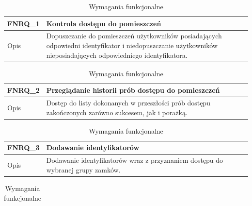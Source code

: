         \begin{table}[h!]
            \caption{Wymagania funkcjonalne}
            \centering
            \begin{subtable}[c]{\textwidth}
                \centering
                \begin{tabular}{p{2cm}|p{12cm}}
                    FNRQ\_1      & \textbf{Kontrola dostępu do pomieszczeń}  \\
                    \hline Opis         & Dopuszczanie do pomieszczeń użytkowników posiadających odpowiedni identyfikator i niedopuszczanie użytkowników nieposiadających odpowiedniego identyfikatora.  \\
                \end{tabular}
                \label{tbl:fnrq1}
                \vspace{10mm}           
            \end{subtable}
        \quad%
            \begin{subtable}[c]{\textwidth}
                \centering
                 \begin{tabular}{p{2cm}|p{12cm}}
                    FNRQ\_2      & \textbf{Przeglądanie historii prób dostępu do pomieszczeń}  \\
                    \hline Opis         & Dostęp do listy dokonanych w przeszłości prób dostępu zakończonych zarówno sukcesem, jak i porażką. \\
                \end{tabular}
                \label{tbl:fnrq2}
                \vspace{10mm}           
            \end{subtable}
            \begin{subtable}[c]{\textwidth}
                \centering
                 \begin{tabular}{p{2cm}|p{12cm}}
                    FNRQ\_3      & \textbf{Dodawanie identyfikatorów}  \\
                    \hline  Opis         & Dodawanie identyfikatorów wraz z przyznaniem dostępu do wybranej grupy zamków. \\
                \end{tabular}
                \label{tbl:fnrq3}
                \vspace{10mm}           
            \end{subtable}
        \quad%
            \begin{subtable}[c]{\textwidth}
                \centering
                 \begin{tabular}{p{2cm}|p{12cm}}

\end{tabular}
\end{subtable}
\end{table}
